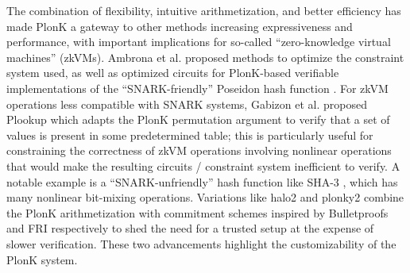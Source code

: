 \noindent The combination of flexibility, intuitive arithmetization, and better efficiency has made PlonK a gateway to other methods increasing expressiveness and performance, with important implications for so-called ``zero-knowledge virtual machines'' (zkVMs). Ambrona et al. \cite{turboplonk} proposed methods to optimize the constraint system used, as well as optimized circuits for PlonK-based verifiable implementations of the ``SNARK-friendly'' Poseidon hash function \cite{poseidon}. For zkVM operations less compatible with SNARK systems, Gabizon et al. proposed Plookup \cite{plookup} which adapts the PlonK permutation argument to verify that a set of values is present in some predetermined table; this is particularly useful for constraining the correctness of zkVM operations involving nonlinear operations that would make the resulting circuits / constraint system inefficient to verify. A notable example is a ``SNARK-unfriendly'' hash function like SHA-3 \cite{sha3}, which has many nonlinear bit-mixing operations. Variations like halo2 \cite{halo2} and plonky2 \cite{plonky2} combine the PlonK arithmetization with commitment schemes inspired by Bulletproofs \cite{bulletproofs} and FRI \cite{fri} respectively to shed the need for a trusted setup at the expense of slower verification. These two advancements highlight the customizability of the PlonK system.

